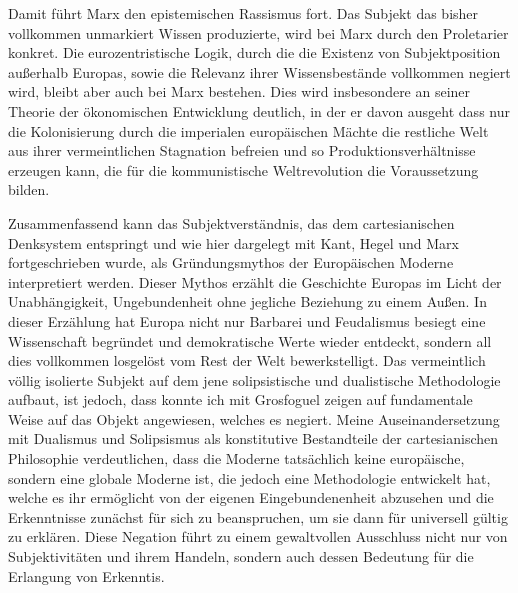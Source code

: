 Damit führt Marx den epistemischen Rassismus fort. Das Subjekt das bisher
vollkommen unmarkiert Wissen produzierte, wird bei Marx durch den Proletarier
konkret. Die eurozentristische Logik, durch die die Existenz von
Subjektposition außerhalb Europas, sowie die Relevanz ihrer Wissensbestände
vollkommen negiert wird, bleibt aber auch bei Marx bestehen.\footnotemark {}  Dies wird
insbesondere an seiner Theorie der ökonomischen Entwicklung deutlich, in der er
davon ausgeht dass nur die Kolonisierung durch die imperialen europäischen
Mächte die restliche Welt aus ihrer vermeintlichen Stagnation befreien und so
Produktionsverhältnisse erzeugen kann, die für die kommunistische
Weltrevolution die Voraussetzung bilden.


Zusammenfassend kann das Subjektverständnis, das dem cartesianischen Denksystem
entspringt und wie hier dargelegt mit Kant, Hegel und Marx fortgeschrieben
wurde, als Gründungsmythos der Europäischen Moderne interpretiert werden. \footnotemark {} 
Dieser Mythos erzählt die Geschichte Europas im Licht der Unabhängigkeit,
Ungebundenheit ohne jegliche Beziehung zu einem Außen. In dieser Erzählung hat
Europa nicht nur Barbarei und Feudalismus besiegt eine Wissenschaft begründet
und demokratische Werte wieder entdeckt, sondern all dies vollkommen losgelöst
vom Rest der Welt bewerkstelligt.\footnotemark {} Das vermeintlich völlig isolierte Subjekt
auf dem jene solipsistische und dualistische Methodologie aufbaut, ist jedoch,
dass konnte ich mit Grosfoguel zeigen auf fundamentale Weise auf das Objekt
angewiesen, welches es negiert. Meine Auseinandersetzung mit Dualismus und
Solipsismus als konstitutive Bestandteile der cartesianischen Philosophie
verdeutlichen, dass die Moderne tatsächlich keine europäische, sondern eine
globale Moderne ist, die jedoch eine Methodologie entwickelt hat, welche es ihr
ermöglicht von der eigenen Eingebundenenheit abzusehen und die Erkenntnisse
zunächst für sich zu beanspruchen, um sie dann für universell gültig zu
erklären. Diese Negation führt zu einem gewaltvollen Ausschluss nicht nur von
Subjektivitäten und ihrem Handeln, sondern auch dessen Bedeutung für die
Erlangung von Erkenntis.

